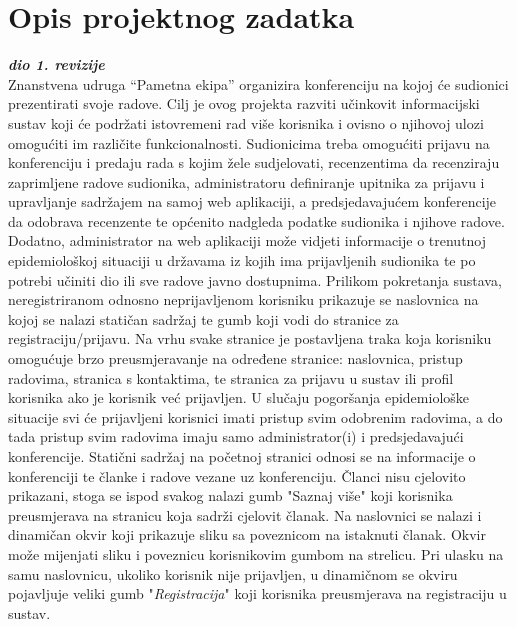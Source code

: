 \chapter{Opis projektnog zadatka}
		
		\textbf{\textit{dio 1. revizije}}\\

		Znanstvena udruga “Pametna ekipa” organizira konferenciju na kojoj će sudionici prezentirati svoje radove. Cilj je ovog projekta razviti učinkovit informacijski sustav koji će podržati istovremeni rad više korisnika i ovisno o njihovoj ulozi omogućiti im različite funkcionalnosti. Sudionicima treba omogućiti prijavu na konferenciju i predaju rada s kojim žele sudjelovati, recenzentima da recenziraju zaprimljene radove sudionika, administratoru definiranje upitnika za prijavu i upravljanje sadržajem na samoj web aplikaciji, a predsjedavajućem konferencije da odobrava recenzente te općenito nadgleda podatke sudionika i njihove radove. Dodatno, administrator na web aplikaciji može vidjeti informacije o trenutnoj epidemiološkoj situaciji u državama iz kojih ima prijavljenih sudionika te po potrebi učiniti dio ili sve radove javno dostupnima.
		\newline
		\newline
		Prilikom pokretanja sustava, neregistriranom odnosno neprijavljenom korisniku prikazuje se naslovnica na kojoj se nalazi statičan sadržaj te gumb koji vodi do stranice za registraciju/prijavu. Na vrhu svake stranice  je postavljena traka koja korisniku omogućuje brzo preusmjeravanje na određene stranice: naslovnica, pristup radovima, stranica s kontaktima, te stranica za prijavu u sustav ili profil korisnika ako je korisnik već prijavljen. U slučaju pogoršanja epidemiološke situacije svi će prijavljeni korisnici imati pristup svim odobrenim radovima, a do tada pristup svim radovima imaju samo administrator(i) i predsjedavajući konferencije. Statični sadržaj na početnoj stranici odnosi se na informacije o konferenciji te članke i radove vezane uz konferenciju. Članci nisu cjelovito prikazani, stoga se ispod svakog nalazi gumb "Saznaj više" koji korisnika preusmjerava na stranicu koja sadrži cjelovit članak. Na naslovnici se nalazi i dinamičan okvir koji prikazuje sliku sa poveznicom na istaknuti članak. Okvir može mijenjati sliku i poveznicu korisnikovim gumbom na strelicu. Pri ulasku na samu naslovnicu, ukoliko korisnik nije prijavljen, u dinamičnom se okviru pojavljuje veliki gumb "\textit{Registracija}" koji korisnika preusmjerava na registraciju u sustav. 
		\newline
